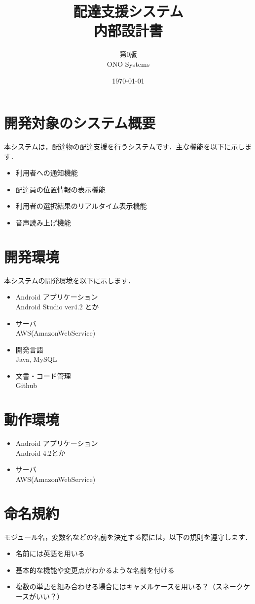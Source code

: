 \documentclass[a4j,titlepage]{jarticle}
\title{\huge 配達支援システム\\
		内部設計書}
\author{第0版\\
        ONO-Systems\\}
\date{\today}
\begin{document}
\maketitle

\tableofcontents
\clearpage


\section{開発対象のシステム概要}
本システムは，配達物の配達支援を行うシステムです．主な機能を以下に示します．
\begin{itemize}
\item 利用者への通知機能
\item 配達員の位置情報の表示機能
\item 利用者の選択結果のリアルタイム表示機能
\item 音声読み上げ機能
\end{itemize}


\section{開発環境}
本システムの開発環境を以下に示します．
\begin{itemize}
\item Android アプリケーション\\
  Android Studio ver4.2 とか
\item サーバ\\
  AWS(AmazonWebService)
\item 開発言語\\
  Java, MySQL
\item 文書・コード管理\\
  Github
\end{itemize}


\section{動作環境}
\begin{itemize}
\item Android アプリケーション\\
  Android 4.2とか
\item サーバ\\
  AWS(AmazonWebService)
\end{itemize}


\section{命名規約}
モジュール名，変数名などの名前を決定する際には，以下の規則を遵守します．
\begin{itemize}
\item 名前には英語を用いる
\item 基本的な機能や変更点がわかるような名前を付ける
\item 複数の単語を組み合わせる場合にはキャメルケースを用いる？（スネークケースがいい？）
\end{itemize}
\end{document}
